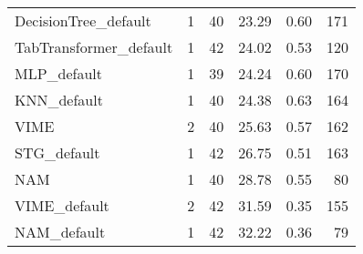 \begin{tabular}{lrrrrr}
DecisionTree_default       &                  1 &  40 &  23.29 &                           0.60 &   171 \\
TabTransformer_default     &                  1 &  42 &  24.02 &                           0.53 &   120 \\
MLP_default                &                  1 &  39 &  24.24 &                           0.60 &   170 \\
KNN_default                &                  1 &  40 &  24.38 &                           0.63 &   164 \\
VIME                       &                  2 &  40 &  25.63 &                           0.57 &   162 \\
STG_default                &                  1 &  42 &  26.75 &                           0.51 &   163 \\
NAM                        &                  1 &  40 &  28.78 &                           0.55 &    80 \\
VIME_default               &                  2 &  42 &  31.59 &                           0.35 &   155 \\
NAM_default                &                  1 &  42 &  32.22 &                           0.36 &    79 \\
\bottomrule
\end{tabular}

